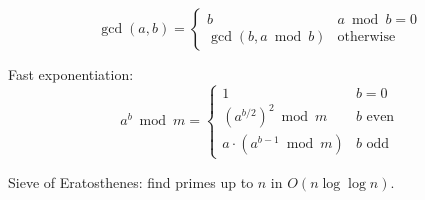 \[
\gcd(a,b) = 
\begin{cases}
b & a \bmod b = 0 \\
\gcd(b, a \bmod b) & \text{otherwise}
\end{cases}
\]

Fast exponentiation:
\[
a^b \bmod m =
\begin{cases}
1 & b=0 \\
(a^{b/2})^2 \bmod m & b \text{ even} \\
a \cdot (a^{b-1} \bmod m) & b \text{ odd}
\end{cases}
\]

Sieve of Eratosthenes: find primes up to $n$ in $O(n \log \log n)$.